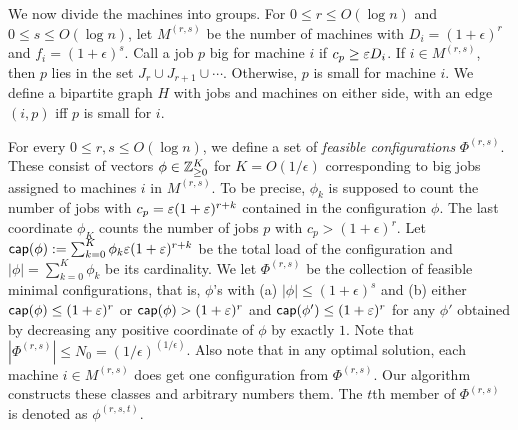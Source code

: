 We now divide the machines into groups. For $0\leq r\leq O(\log n)$ and $0\leq s\leq O(\log n)$, let $M^{(r,s)}$ be the number of machines with $D_i = (1+\epsilon)^r$ and $f_i = (1+\epsilon)^s$.
%
\def\sm{\mathsf{small}}
Call a job $p$  big  for machine $i$ if $c_p \geq \varepsilon D_i$. If $i\in M^{(r,s)}$, then $p$ lies in the set $J_r \cup J_{r+1} \cup \cdots$.
Otherwise, $p$ is small for machine $i$.
We define a bipartite graph $H$ with jobs and machines on either side, with an edge $(i,p)$ iff $p$ is small for $i$. 

For every $0\leq r,s \leq O(\log n)$, we define a set of {\em feasible configurations} $\Phi^{(r,s)}$. These consist of vectors $\phi \in {\mathbb Z}^K_{\geq 0}$ for $K=O(1/\epsilon)$ corresponding to big jobs assigned to machines $i$ in $M^{(r,s)}$.
To be precise, $\phi_k$ is supposed to count the number of jobs with $c_p = \varepsilon (1+\varepsilon)^{r+k}$ contained in the configuration $\phi$. 
The last coordinate $\phi_K$ counts the number of jobs $p$ with $c_p > (1+\epsilon)^r$.
Let
$\mathsf{cap}(\phi) := \sum_{k=0}^K \phi_k \varepsilon(1+\varepsilon)^{r+k}$ be the total load of the configuration and $|\phi| = \sum_{k=0}^K \phi_k$ be its cardinality.
We let $\Phi^{(r,s)}$ be the collection of feasible minimal configurations, that is, $\phi$'s with (a) $|\phi|\leq (1+\epsilon)^s$ and (b) either $\mathsf{cap}(\phi)\leq (1+\varepsilon)^r$ or $\mathsf{cap}(\phi) > (1+\varepsilon)^r$ and $\mathsf{cap}(\phi') \leq (1+\varepsilon)^r$ for any $\phi'$ obtained by decreasing any positive coordinate of $\phi$ by exactly $1$. Note that $|\Phi^{(r,s)}| \leq N_0 = (1/\epsilon)^{(1/\epsilon)}$. Also note that in any optimal solution, each machine $i\in M^{(r,s)}$ does get one configuration from $\Phi^{(r,s)}$. 
Our algorithm constructs these classes and arbitrary numbers them. The $t$th member of $\Phi^{(r,s)}$ is denoted as $\phi^{(r,s,t)}$.%

